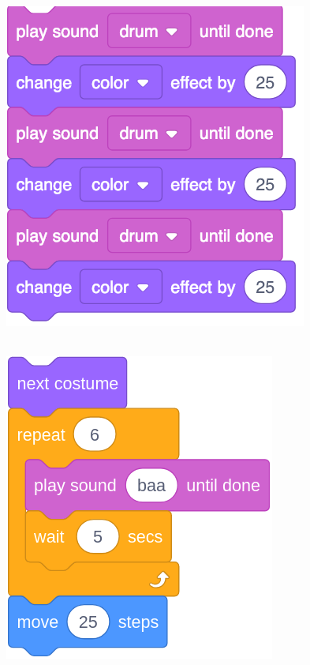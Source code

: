 \documentclass[letterpaper,12pt]{article}
\begin{document}
\includegraphics[scale=.25,valign=t]{q4_script4.png} \hspace{1.25cm} \\

\noindent \dotfill \\

\begin{center}
\includegraphics[scale=.3]{q5_script0.png}
\end{center}
\end{document}
